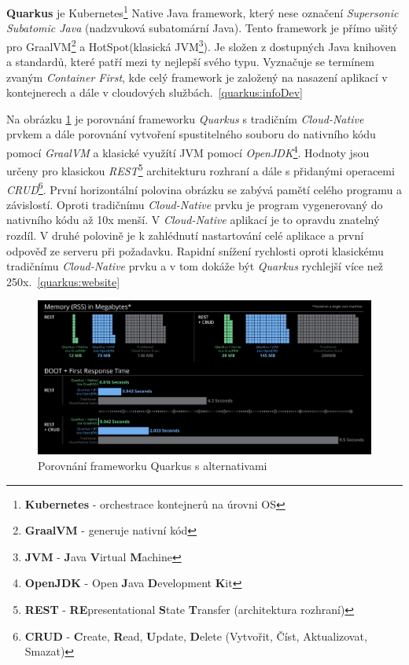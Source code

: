 \textbf{Quarkus} je Kubernetes\footnote{\textbf{Kubernetes} - orchestrace kontejnerů na úrovni OS} Native Java framework, který nese označení \emph{Supersonic Subatomic Java} (nadzvuková subatomární Java). Tento framework je přímo ušitý pro GraalVM\footnote{\textbf{GraalVM} - generuje nativní kód} a HotSpot(klasická JVM\footnote{\textbf{JVM} - \textbf{J}ava \textbf{V}irtual \textbf{M}achine}).
Je složen z dostupných Java knihoven a standardů, které patří mezi ty nejlepší svého typu. Vyznačuje se termínem zvaným \emph{Container First}, kde celý framework je založený na nasazení aplikací v kontejnerech a dále v cloudových službách.~\ref{quarkus:infoDev}
\newpage

Na obrázku \ref{figure:quarkus_stats} je porovnání frameworku \emph{Quarkus} s tradičním \emph{Cloud-Native} prvkem a dále porovnání vytvoření spustitelného souboru do nativního kódu pomocí \emph{GraalVM} a klasické využítí JVM pomocí \emph{OpenJDK}\footnote{\textbf{OpenJDK} - Open \textbf{J}ava \textbf{D}evelopment \textbf{K}it}.
Hodnoty jsou určeny pro klasickou \emph{REST}\footnote{\textbf{REST} - \textbf{RE}presentational \textbf{S}tate \textbf{T}ransfer (architektura rozhraní)} architekturu rozhraní a dále s přidanými operacemi \emph{CRUD}\footnote{\textbf{CRUD} - \textbf{C}reate, \textbf{R}ead, \textbf{U}pdate, \textbf{D}elete (Vytvořit, Číst, Aktualizovat, Smazat)}.
První horizontální polovina obrázku se zabývá pamětí celého programu a závislostí. Oproti tradičnímu \emph{Cloud-Native} prvku je program vygenerovaný do nativního kódu až 10x menší. V \emph{Cloud-Native} aplikací je to opravdu znatelný rozdíl.
V druhé polovině je k zahlédnutí nastartování celé aplikace a první odpověď ze serveru při požadavku. Rapidní snížení rychlosti oproti klasickému tradičnímu \emph{Cloud-Native} prvku a v tom dokáže být \emph{Quarkus} rychlejší více než 250x.~\ref{quarkus:website}

\begin{figure}[hbt]
  \centering
  \includegraphics[width=1 \linewidth]{obrazky-figures/quarkus_stats.png}
  \caption{Porovnání frameworku Quarkus s alternativami}
  \label{figure:quarkus_stats}
\end{figure}

